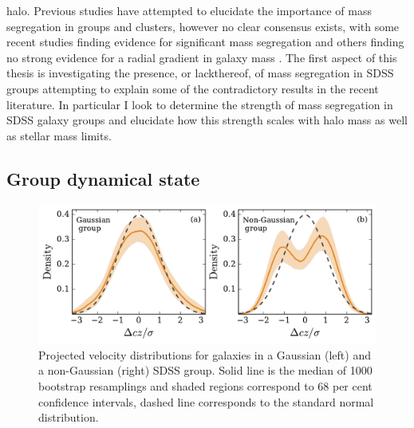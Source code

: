 halo.  Previous studies have attempted to elucidate the importance of
mass segregation in groups and clusters, however no clear consensus
exists, with some recent studies finding evidence for significant mass
segregation \citep{vandenbosch2008a, presotto2012, balogh2014} and others finding no strong evidence for a radial gradient in galaxy mass \citep{vonderlinden2010, vulcani2013, ziparo2013}.  The first aspect of this thesis is investigating the presence, or lackthereof, of mass segregation in SDSS groups attempting to explain some of the contradictory results in the recent literature.  In particular I look to determine the strength of mass segregation in SDSS galaxy groups and elucidate how this strength scales with halo mass as well as stellar mass limits.  

\subsection{Group dynamical state}
\label{sec:dyn_state}

\begin{figure}[!ht]
  \centering
  \includegraphics[width=\textwidth]{vdist.pdf}
  \caption[Projected velocity distributions for galaxies in Gaussian
    and non-Gaussian SDSS groups]{Projected velocity distributions for galaxies in a
    Gaussian (left) and a non-Gaussian (right) SDSS group.  Solid line
    is the median of 1000
  bootstrap resamplings and shaded regions correspond to 68 per cent
  confidence intervals, dashed line corresponds to the standard normal
  distribution.}
  \label{fig:vdist}
\end{figure}


